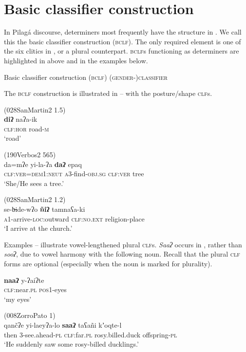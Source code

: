 \documentclass[output=paper,colorlinks,citecolor=brown]{langscibook}
\begin{document}
\section{Basic classifier construction}\label{sec:payne:3}

In Pilagá discourse, determiners most frequently have the structure in . We call this the basic classifier construction (\textsc{bclf}). The only required element is one of the six clitics in , or a plural counterpart. \textsc{bclf}s functioning as determiners are highlighted in  above and in the examples below.

\ea\label{ex:payne:3} {Basic classifier construction (\textsc{bclf})}
\glt \textsc{(gender-)classifier}
\z

The \textsc{bclf} construction is illustrated in – with the posture/shape \textsc{clf}s.

\ea\label{ex:payne:4} (028SanMartin2 1.5)\\
\gll  \textbf{diʔ}  naʔa-ik\\
\textsc{clf:hor}  road-\textsc{m}\\
\glt ‘road’ 
\z

\ea\label{ex:payne:5} (190Verbos2 565)\\
\gll  da=mʔe  yi-la-ʔa  \textbf{daʔ}  epaq\\
\textsc{clf:ver=dem1:neut} \textsc{a3}-find-\textsc{obj.sg} \textsc{clf:ver} tree\\
\glt ‘She/He sees a tree.’ 
\z

\ea\label{ex:payne:6} (028SanMartin2 1.2)\\
\gll  se-b̶ide-wʔo  \textbf{ñiʔ}  tamnaʕa-ki\\
\textsc{a1}-arrive-\textsc{loc}:outward  \textsc{clf:no.ext} religion-place\\
\glt ‘I arrive at the church.’ 
\z

Examples – illustrate vowel-lengthened plural \textsc{clf}s. \textit{Saaʔ} occurs in , rather than \textit{sooʔ}, due to vowel harmony with the following noun. Recall that the plural \textsc{clf} forms are optional (especially when the noun is marked for plurality).

\ea\label{ex:payne:7}
\gll  \textbf{naaʔ}  y-ʔaiʔte\\
\textsc{clf}:near.\textsc{pl}  \textsc{pos1}-eyes\\
\glt ‘my eyes’
\z

\ea\label{ex:payne:8}  (008ZorroPato 1)\\
\gll  qančʔe  yi-laeyʔa-lo  \textbf{saaʔ}  taʕañi  kʼoqte-l\\
then \textsc{3}-see.ahead-\textsc{pl}  \textsc{clf}:far.\textsc{pl} rosy.billed.duck  offspring-\textsc{pl}\\
\glt ‘He suddenly saw some rosy-billed ducklings.’
\z
\end{document}
